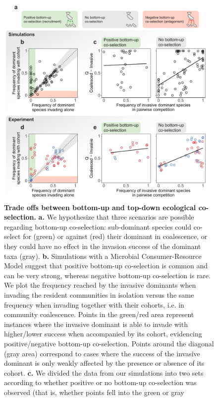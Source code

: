 \documentclass[a4paper,10pt]{article}
\begin{document}
\begin{figure}[!h]
\centering
\internallinenumbers
\includegraphics[scale=0.7,keepaspectratio]{figs/fig3.pdf}
\caption{\textbf{Trade offs between bottom-up and top-down ecological co-selection.}
\textbf{a.} We hypothesize that three scenarios are possible regarding bottom-up co-selection:
sub-dominant species could co-select for (green) or against (red) their dominant in coalescence,
or they could have no effect in the invasion success of the dominant taxa (gray).
\textbf{b.} Simulations with a Microbial Consumer-Resource Model suggest that positive bottom-up
co-selection is common and can be very strong, whereas negative bottom-up co-selection is rare.
We plot the frequency reached by the invasive dominants when invading the resident communities
in isolation versus the same frequency when invading together with their cohorts,
i.e. in community coalescence.
Points in the green/red area represent instances where the invasive dominant is able to invade
with higher/lower success when accompanied by its cohort, evidencing positive/negative
bottom-up co-selection.
Points around the diagonal (gray area) correspond to cases where the success of the invasive dominant
is only weakly affected by the presence or absence of its cohort.
\textbf{c.} We divided the data from our simulations into two sets according to whether
positive or no bottom-up co-selection was observed (that is, whether points fell into the green or gray
}
\end{figure}
\end{document}
